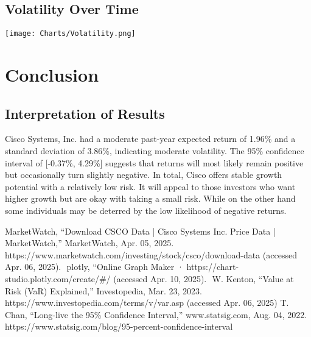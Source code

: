 \documentclass[12]{amsart}
\begin{document}
\begin{flushleft}
\begin{flushleft}
\subsection*{Volatility Over Time}
\texttt{[image: Charts/Volatility.png]}
\bigbreak


\section{Conclusion}
\subsection{Interpretation of Results}
Cisco Systems, Inc. had a moderate past-year expected return of 1.96\% and a standard deviation of 3.86\%, indicating moderate volatility. The 95\% confidence interval of [-0.37\%, 4.29\%] suggests that returns will most likely remain positive but occasionally turn slightly negative.
\bigbreak
In total, Cisco offers stable growth potential with a relatively low risk. It will appeal to those investors who want higher growth but are okay with taking a small risk. While on the other hand some individuals may be deterred by the low likelihood of negative returns.
\bigbreak
{}

\begin{thebibliography}{100}
MarketWatch, “Download CSCO Data | Cisco Systems Inc. Price Data | MarketWatch,” MarketWatch, Apr. 05, 2025. https://www.marketwatch.com/investing/stock/csco/download-data (accessed Apr. 06, 2025).
‌\newline
{}
plotly, “Online Graph Maker · https://chart-studio.plotly.com/create/\#/ (accessed Apr. 10, 2025).
‌\newline
{}
W. Kenton, “Value at Risk (VaR) Explained,” Investopedia, Mar. 23, 2023. https://www.investopedia.com/terms/v/var.asp (accessed Apr. 06, 2025)
\newline
{}
T. Chan, “Long-live the 95\% Confidence Interval,” www.statsig.com, Aug. 04, 2022. https://www.statsig.com/blog/95-percent-confidence-interval
‌
\end{thebibliography}
\end{flushleft}
\end{flushleft}
\end{document}
